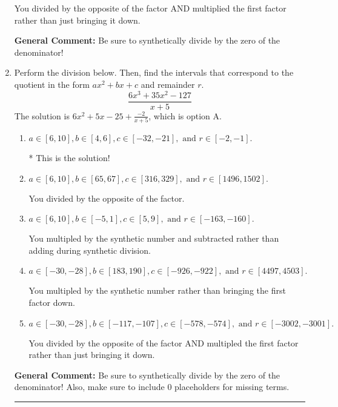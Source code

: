 \documentclass{extbook}[14pt]
\newcommand{\litem}[1]{\item #1

\rule{\textwidth}{0.4pt}}
\begin{document}
\begin{enumerate}
{\begin{enumerate}[label=\Alph*.]
 You divided by the opposite of the factor AND multiplied the first factor rather than just bringing it down.
\end{enumerate}

\textbf{General Comment:} Be sure to synthetically divide by the zero of the denominator!
}
\litem{
Perform the division below. Then, find the intervals that correspond to the quotient in the form $ax^2+bx+c$ and remainder $r$.
\[ \frac{6x^{3} +35 x^{2} -127}{x + 5} \]The solution is \( 6x^{2} +5 x -25 + \frac{-2}{x + 5} \), which is option A.\begin{enumerate}[label=\Alph*.]
\item \( a \in [6, 10], b \in [4, 6], c \in [-32, -21], \text{ and } r \in [-2, -1]. \)

* This is the solution!
\item \( a \in [6, 10], b \in [65, 67], c \in [316, 329], \text{ and } r \in [1496, 1502]. \)

 You divided by the opposite of the factor.
\item \( a \in [6, 10], b \in [-5, 1], c \in [5, 9], \text{ and } r \in [-163, -160]. \)

 You multipled by the synthetic number and subtracted rather than adding during synthetic division.
\item \( a \in [-30, -28], b \in [183, 190], c \in [-926, -922], \text{ and } r \in [4497, 4503]. \)

 You multipled by the synthetic number rather than bringing the first factor down.
\item \( a \in [-30, -28], b \in [-117, -107], c \in [-578, -574], \text{ and } r \in [-3002, -3001]. \)

 You divided by the opposite of the factor AND multipled the first factor rather than just bringing it down.
\end{enumerate}

\textbf{General Comment:} Be sure to synthetically divide by the zero of the denominator! Also, make sure to include 0 placeholders for missing terms.
}
\end{enumerate}
\end{document}

